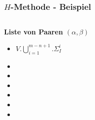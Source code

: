 \documentclass[10pt]{beamer}
\begin{document}
\begin{frame}
\frametitle{$H$-Methode - Beispiel}
\begin{columns}[T] %

\begin{column}{.4\textwidth}
\textbf{Liste von Paaren $(\alpha,\beta)$}\\
  \begin{itemize}
	\item<1>$V.\bigcup\limits_{i=1}^{m-n+1}.\Sigma_I^i$
	\item<2-3>
    \item<4-5>
    \item<6-7>
    \item<8-9>
    \item<10-11>
    \item<12-13>
  \end{itemize}
\end{column}%


\end{columns}
\end{frame}
\end{document}
